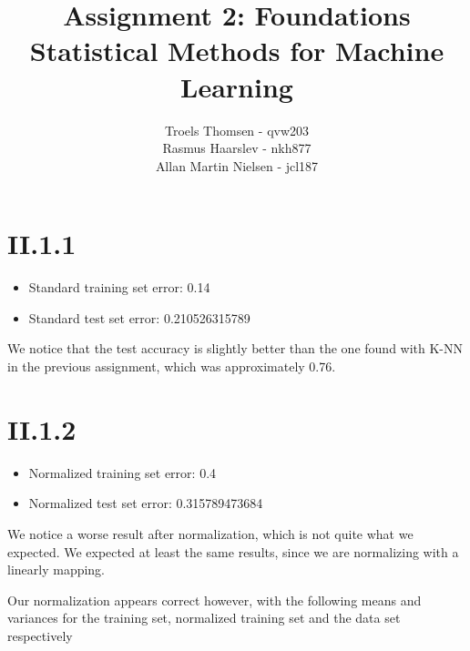 \documentclass[12pt, a4paper]{article}
\title{Assignment 2: Foundations\\Statistical Methods for Machine Learning}
\author{Troels Thomsen - qvw203\\Rasmus Haarslev - nkh877\\Allan Martin Nielsen - jcl187}
\begin{document}
\pagestyle{empty}
\maketitle
{}
\newpage

\tableofcontents
\newpage

\pagestyle{fancy}

\section{II.1.1}
\begin{itemize}
	\item Standard training set error: 0.14
	\item Standard test set error: 0.210526315789
\end{itemize}

We notice that the test accuracy is slightly better than the one found with K-NN in the previous assignment, which was approximately 0.76.

\section{II.1.2}
\begin{itemize}
	\item Normalized training set error: 0.4
	\item Normalized test set error: 0.315789473684
\end{itemize}

We notice a worse result after normalization, which is not quite what we expected. We expected at least the same results, since we are normalizing with a linearly mapping.

Our normalization appears correct however, with the following means and variances for the training set, normalized training set and the data set respectively
\end{document}
